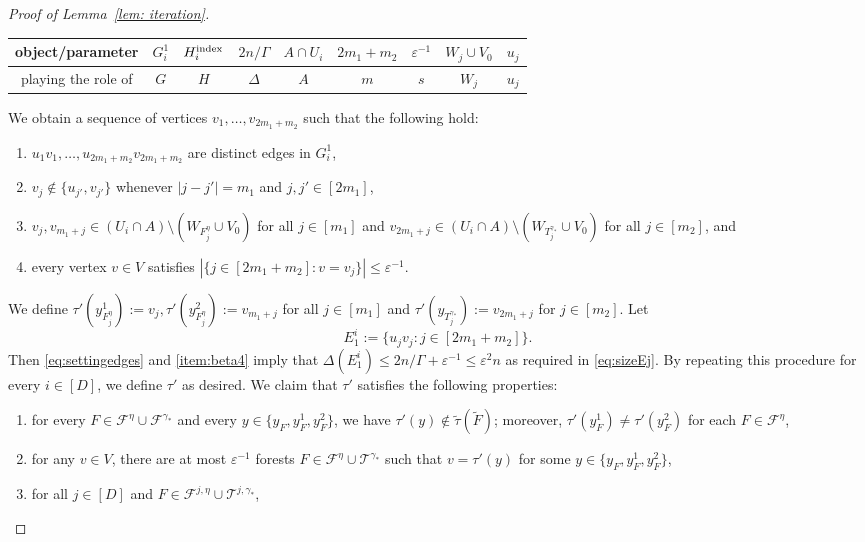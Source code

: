 \documentclass[a4paper, 11pt, reqno]{amsart}
\numberwithin{equation}{section}
\newcommand{\1}{{\rm 1\hspace*{-0.4ex}%
\rule{0.1ex}{1.52ex}\hspace*{0.2ex}}}
\newcommand{\cF}{\mathcal{F}}
\newcommand{\sF}{\mathscr{F}}
\newcommand{\sT}{\mathscr{T}}
\renewcommand{\epsilon}{\varepsilon}
\newcommand{\sm}{\setminus}
\begin{document}
\begin{proof}[Proof of Lemma~\ref{lem: iteration}]
\noindent
{
\begin{tabular}{c|c|c|c|c|c|c|c|c}
object/parameter & $G^1_{i}$ & $H^{\rm index}_{i}$ & $2n/\Gamma$ & $A\cap U_{i}$ &   $2m_1+m_2$ & $\epsilon^{-1} $  &  $W_{j}\cup V_0$ & $u_j$
\\ \hline
playing the role of & $G$ & $H$ & $\Delta$ & $A$ &  $m$ & $s$ &$W_{j}$ & $u_j$
\end{tabular}
}\newline \vspace{0.2cm}

\noindent
We obtain a sequence of vertices $v_1,\dots, v_{2m_1+m_2}$ 
such that the following hold:
\begin{enumerate}[label=($\beta$\arabic*)]
	\item\label{item:beta1} $u_1v_1,\ldots,u_{2m_1+m_2}v_{2m_1+m_2}$ are distinct edges in $G^1_i$,
	\item\label{item:beta2} $v_j\notin \{u_{j'},v_{j'}\}$ whenever $|j-j'|=m_1$ and $j,j'\in [2m_1]$,
	\item\label{item:beta3} $v_j,v_{m_1+j}\in (U_i \cap A)\sm (W_{F_j^\eta}\cup V_0)$ for all $j\in [m_1]$ and 
	$v_{2m_1+j}\in (U_i \cap A)\sm (W_{T_j^{\gamma_*}}\cup V_0)$ for all $j\in [m_2]$, and
	\item\label{item:beta4} every vertex $v \in V$ satisfies $|\{j\in [2m_1+m_2]: v=v_j\}|\leq \epsilon^{-1}$. 
\end{enumerate}
We define $\tau'(y^1_{F_j^\eta}):=v_j, \tau'(y^2_{F_j^\eta}):= v_{m_1+j}$ for all $j\in [m_1]$ and 
$\tau'(y_{T_j^{\gamma_*}}):= v_{2m_1+j}$ for $j\in[m_2]$. 
Let 
$$E^{i}_1:= \{u_jv_j: j\in [2m_1+m_2]\}.$$
Then \eqref{eq:settingedges} and \ref{item:beta4} imply that $\Delta(E^{i}_1) \leq 2n/\Gamma + \epsilon^{-1} \leq \epsilon^2 n$ as required in \eqref{eq:sizeEj}. 
By repeating this procedure for every $i\in [D]$, we define $\tau'$ as desired.
We claim that $\tau'$ satisfies the following properties:
\begin{enumerate}[label=($\gamma$\arabic*)]
	\item \label{item:gamma0} for every $F\in \cF^\eta\cup \cF^{\gamma_*}$ and every $y\in \{y_F, y^1_F, y^2_F\}$,
	we have
	$\tau'(y)\notin \tilde{\tau}(\tilde{F})$;
	moreover,
	$\tau'(y_F^1)\neq \tau'(y_F^2)$ for each $F\in \cF^\eta$,
	\item \label{item:gamma1} for any $v\in V$,
	there are  at most $\epsilon^{-1}$ forests $F\in \sF^{\eta}\cup \sT^{\gamma_*}$ 
	such that $v=\tau'(y)$ for some $y \in \{y_F, y^1_F, y^2_F\}$,
	\item \label{item:gamma2} for all $j\in [D]$ and $F\in \sF^{j,\eta}\cup \sT^{j,\gamma_*}$, 

\end{enumerate}
\end{proof}
\end{document}
